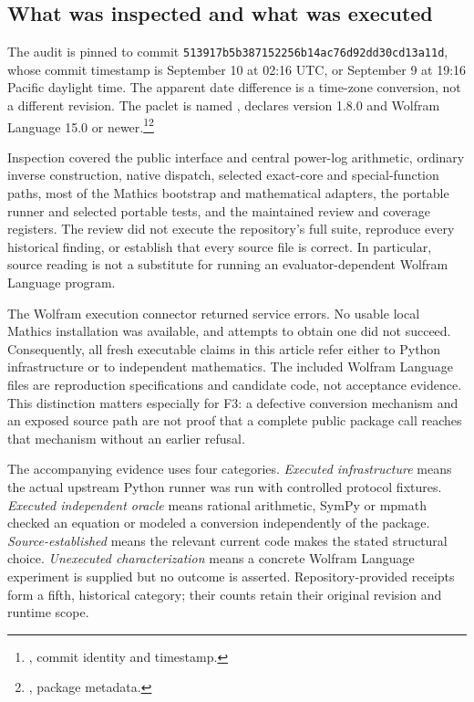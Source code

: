 \documentclass[11pt,letterpaper]{article}
\newcommand{\code}[1]{\texttt{\detokenize{#1}}}
\newcommand{\src}[2]{\footnote{\cite{#1}, #2.}}
\begin{document}
\subsection{What was inspected and what was executed}

The audit is pinned to commit \nolinkurl{513917b5b387152256b14ac76d92dd30cd13a11d}, whose commit timestamp is September 10 at 02:16 UTC, or September 9 at 19:16 Pacific daylight time. The apparent date difference is a time-zone conversion, not a different revision. The paclet is named \code{AsymptoticAnalysis}, declares version 1.8.0 and Wolfram Language 15.0 or newer.\src{commit}{commit identity and timestamp}\src{paclet}{package metadata}

Inspection covered the public interface and central power-log arithmetic, ordinary inverse construction, native dispatch, selected exact-core and special-function paths, most of the Mathics bootstrap and mathematical adapters, the portable runner and selected portable tests, and the maintained review and coverage registers. The review did not execute the repository's full suite, reproduce every historical finding, or establish that every source file is correct. In particular, source reading is not a substitute for running an evaluator-dependent Wolfram Language program.

The Wolfram execution connector returned service errors. No usable local Mathics installation was available, and attempts to obtain one did not succeed. Consequently, all fresh executable claims in this article refer either to Python infrastructure or to independent mathematics. The included Wolfram Language files are reproduction specifications and candidate code, not acceptance evidence. This distinction matters especially for F3: a defective conversion mechanism and an exposed source path are not proof that a complete public package call reaches that mechanism without an earlier refusal.

The accompanying evidence uses four categories. \emph{Executed infrastructure} means the actual upstream Python runner was run with controlled protocol fixtures. \emph{Executed independent oracle} means rational arithmetic, SymPy or mpmath checked an equation or modeled a conversion independently of the package. \emph{Source-established} means the relevant current code makes the stated structural choice. \emph{Unexecuted characterization} means a concrete Wolfram Language experiment is supplied but no outcome is asserted. Repository-provided receipts form a fifth, historical category; their counts retain their original revision and runtime scope.
\end{document}
